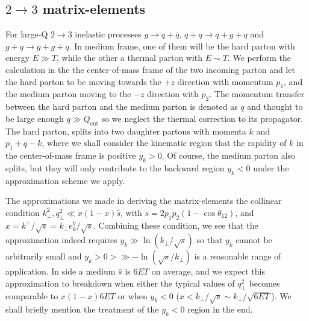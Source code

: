 \subsection{$2\rightarrow 3$ matrix-elements}
For large-Q $2\rightarrow 3$ inelastic processes $g\rightarrow q+\bar{q}$, $q+q\rightarrow q+g+q$ and $g+q\rightarrow g+g+q$.
In medium frame, one of them will be the hard parton with energy $E\gg T$, while the other a thermal parton with $E\sim T$.
We perform the calculation in the the center-of-mass frame of the two incoming parton and let the hard parton to be moving towards the $+z$ direction with momentum $p_1$, and the medium parton moving to the $-z$ direction with $p_2$.
The momentum transfer between the hard parton and the medium parton is denoted as $q$ and thought to be large enough $q\gg Q_{\textrm{cut}}$ so we neglect the thermal correction to its propagator.
The hard parton, splits into two daughter partons with momenta $k$ and $p_1 + q - k$, where we shall consider the kinematic region that the rapidity of $k$ in the center-of-mass frame is positive $y_k > 0$.
Of course, the medium parton also splits, but they will only contribute to the backward region $y_k<0$ under the approximation scheme we apply.

The approximations we made in deriving the matrix-elements the collinear condition $k_\perp^2, q_\perp^2 \ll x(1-x) \hat{s}$, with $s = 2p_1p_2(1-\cos\theta_{12})$, and $x = k^+/\sqrt{s} = k_\perp e^y_k /\sqrt{s}$.
Combining these condition, we see that the approximation indeed requires $y_k \gg \ln(k_\perp/\sqrt{s})$ so that $y_k$ cannot be arbitrarily small and $y_k>0>\gg -\ln(\sqrt{s}/k_\perp)$ is a reasonable range of application.
In side a medium $\hat{s}$ is $6 ET$ on average, and we expect this approximation to breakdown when either the typical values of $q_\perp^2$ becomes comparable to $x(1-x)6ET$ or when $y_k<0$ ($x < k_\perp/\sqrt{s} \sim k_\perp/\sqrt{6ET}$).
We shall briefly mention the treatment of the $y_k<0$ region in the end.

